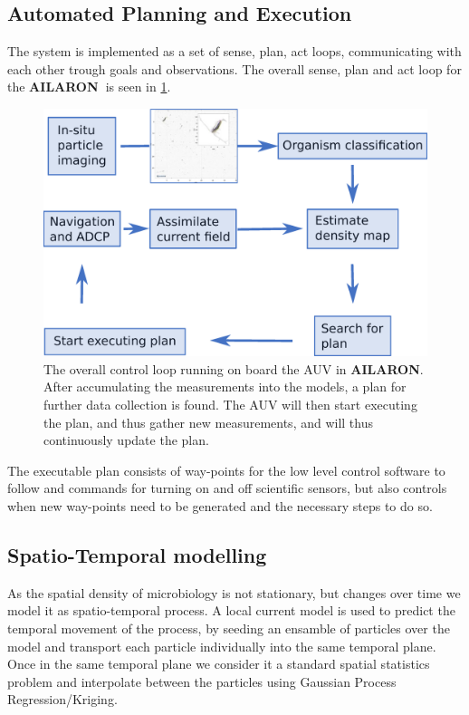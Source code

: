 \documentclass[conference]{IEEEtran}
\def\proj{{\textbf{AILARON\ }}}
\def\proje{{\textbf{AILARON}}}
\newcommand{\cmt}[1]{{\color{red}{#1}}}
\begin{document}
\subsection{Automated Planning and Execution}

The system is implemented as a set of sense, plan, act loops, communicating with each other trough goals and observations. \cite{rajan12}
The overall sense, plan and act loop for the \proj is seen in \cref{fig:sensePlanActLoop}. 
\begin{figure}[tbp]
\centerline{\includegraphics[width=0.9\linewidth]{figures/workflow-simplified.eps}}
\caption{The overall control loop running on board the AUV in \proje. After accumulating the measurements into the models, a plan for further data collection is found. The AUV will then start executing the plan, and thus gather new measurements, and will thus continuously update the plan.}
\label{fig:sensePlanActLoop}
\end{figure}
The executable plan consists of way-points for the low level control software to follow and commands for turning on and off scientific sensors, but also controls when new way-points need to be generated and the necessary steps to do so.

\subsection{Spatio-Temporal modelling}
As the spatial density of microbiology is not stationary, but changes over time we model it as spatio-temporal process. 
A local current model is used to predict the temporal movement of the process, by seeding an ensamble of particles over the model and transport each particle individually into the same temporal plane.
Once in the same temporal plane we consider it a standard spatial statistics problem and interpolate between the particles using Gaussian Process Regression/Kriging.
\end{document}

